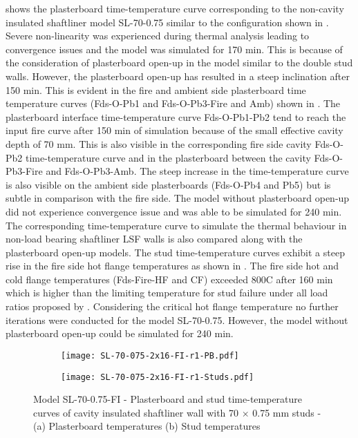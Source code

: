  shows the plasterboard time-temperature curve corresponding to the non-cavity insulated shaftliner model SL-70-0.75 similar to the configuration shown in . Severe non-linearity was experienced during thermal analysis leading to convergence issues and the model was simulated for 170 min. This is because of the consideration of plasterboard open-up in the model similar to the double stud walls. However, the plasterboard open-up has resulted in a steep inclination after 150 min. This is evident in the fire and ambient side plasterboard time temperature curves (Fds-O-Pb1 and Fds-O-Pb3-Fire and Amb) shown in . The plasterboard interface time-temperature curve Fds-O-Pb1-Pb2 tend to reach the input fire curve after 150 min of simulation because of the small effective cavity depth of 70 mm. This is also visible in the corresponding fire side cavity Fds-O-Pb2 time-temperature curve and in the plasterboard between the cavity Fds-O-Pb3-Fire and Fds-O-Pb3-Amb. The steep increase in the time-temperature curve is also visible on the ambient side plasterboards (Fds-O-Pb4 and Pb5) but is subtle in comparison with the fire side. The model without plasterboard open-up did not experience convergence issue and was able to be simulated for 240 min. The corresponding time-temperature curve to simulate the thermal behaviour in non-load bearing shaftliner LSF walls is also compared along with the plasterboard open-up models. The stud time-temperature curves exhibit a steep rise in the fire side hot flange temperatures as shown in . The fire side hot and cold flange temperatures (Fds-Fire-HF and CF) exceeded 800\degree C after 160 min which is higher than the limiting temperature for stud failure under all load ratios proposed by \citet{Gunalan2013a}. Considering the critical hot flange temperature no further iterations were conducted for the model SL-70-0.75. However, the model without plasterboard open-up could be simulated for 240 min.
\begin{figure}[!htbp]
	\centering
	\begin{subfigure}[b]{0.6\textwidth}
		\centering
		\texttt{[image: SL-70-075-2x16-FI-r1-PB.pdf]}
		\caption{}
		\label{subfig:SL-70-075-2x16-FI-r1-PB}
	\end{subfigure}
	\begin{subfigure}[b]{0.6\textwidth}
		\centering
		\texttt{[image: SL-70-075-2x16-FI-r1-Studs.pdf]}
		\caption{}
		\label{subfig:SL-70-075-2x16-FI-r1-Studs}
	\end{subfigure}
	   \caption{Model SL-70-0.75-FI - Plasterboard and stud time-temperature curves of cavity insulated shaftliner wall with 70 $\times$ 0.75 mm studs - (a) Plasterboard temperatures (b) Stud temperatures}
	   \label{fig:SL-70-075-2x16-FI-r1}
\end{figure}

